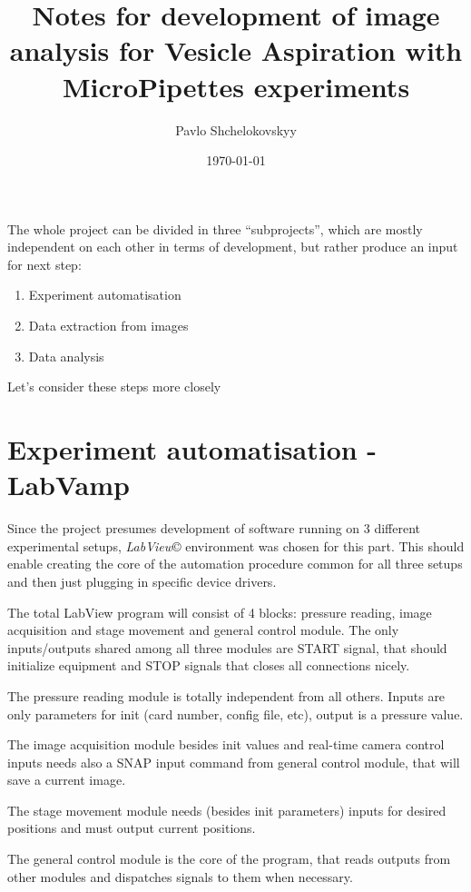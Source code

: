 \documentclass[a4paper,12pt]{article}
\begin{document}
\title{Notes for development of image analysis for Vesicle Aspiration with MicroPipettes experiments}
\author{Pavlo Shchelokovskyy}
\date{\today}
\maketitle

The whole project can be divided in three ``subprojects'', which are mostly independent on each other in terms of development, but rather produce an input for next step:
\begin{enumerate}
	\item Experiment automatisation
	\item Data extraction from images
	\item Data analysis
\end{enumerate}
Let's consider these steps more closely

\section{Experiment automatisation - LabVamp}\label{experiment}

Since the project presumes development of software running on 3 different experimental setups, \emph{LabView}\copyright{} environment was chosen for this part. This should enable creating the core of the automation procedure common for all three setups and then just plugging in specific device drivers.

The total LabView program will consist of 4 blocks: pressure reading, image acquisition and stage movement and general control module. The only inputs/outputs shared among all three modules are START signal, that should initialize equipment and STOP signals that closes all connections nicely.

The pressure reading module is totally independent from all others. Inputs are only parameters for init (card number, config file, etc), output is a pressure value.

The image acquisition module besides init values and real-time camera control inputs needs also a SNAP input command from general control module, that will save a current image.

The stage movement module needs (besides init parameters) inputs for desired positions and must output current positions.

The general control module is the core of the program, that reads outputs from other modules and dispatches signals to them when necessary.
\end{document}
